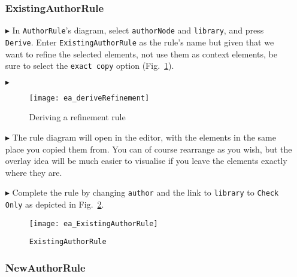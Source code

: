 \begin{itemize}

\subsubsection{ExistingAuthorRule} %

\item[$\blacktriangleright$] In \texttt{AuthorRule}'s diagram, select \texttt{authorNode} and \texttt{library}, and press \texttt{Derive}. Enter
\texttt{ExistingAuthorRule} as the rule's name but given that we want to refine the selected elements, not use them as context elements,
be sure to select the \texttt{exact copy} option (Fig.~\ref{ea:deriveRefinement}).

\item[$\blacktriangleright$]

\begin{figure}[htbp]
\begin{center}
  \texttt{[image: ea\_deriveRefinement]}
  \caption{Deriving a refinement rule}
  \label{ea:deriveRefinement}
\end{center}
\end{figure}

\item[$\blacktriangleright$] The rule diagram will open in the editor, with the elements in the same place you copied them from. You can of course rearrange as
you wish, but the overlay idea will  be much easier to visualise if you leave the elements exactly where they are.

\item[$\blacktriangleright$] Complete the rule by changing \texttt{author} and the link to \texttt{library} to \texttt{Check Only} as depicted in
Fig.~\ref{ea:existingAuthorRule}.

\begin{figure}[htbp]
\begin{center}
  \texttt{[image: ea\_ExistingAuthorRule]}
  \caption{\texttt{ExistingAuthorRule}}
  \label{ea:existingAuthorRule}
\end{center}
\end{figure}

\subsubsection{NewAuthorRule} %


\end{itemize}
